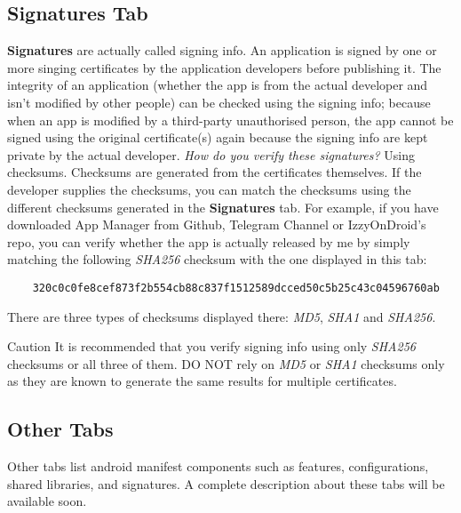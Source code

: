 \subsection{Signatures Tab}\label{subsec:signatures-tab} %
\textbf{Signatures} are actually called signing info. An application is signed by one or more singing certificates by
the application developers before publishing it. The integrity of an application (whether the app is from the actual
developer and isn't modified by other people) can be checked using the signing info; because when an app is modified by
a third-party unauthorised person, the app cannot be signed using the original certificate(s) again because the signing
info are kept private by the actual developer. \textit{How do you verify these signatures?} Using checksums. Checksums
are generated from the certificates themselves. If the developer supplies the checksums, you can match the checksums
using the different checksums generated in the \textbf{Signatures} tab. For example, if you have downloaded App Manager
from Github, Telegram Channel or IzzyOnDroid's repo, you can verify whether the app is actually released by me by simply
matching the following \textit{SHA256} checksum with the one displayed in this tab:
\begin{Verbatim}
    320c0c0fe8cef873f2b554cb88c837f1512589dcced50c5b25c43c04596760ab
\end{Verbatim}

There are three types of checksums displayed there: \textit{MD5}, \textit{SHA1} and \textit{SHA256}.

\begin{danger}{Caution}
    It is recommended that you verify signing info using only \textit{SHA256} checksums or all three of them. DO NOT
    rely on \textit{MD5} or \textit{SHA1} checksums only as they are known to generate the same results for multiple
    certificates.
\end{danger}

\subsection{Other Tabs}\label{subsec:other-tabs} %
Other tabs list android manifest components such as features, configurations, shared libraries, and signatures. A
complete description about these tabs will be available soon.
